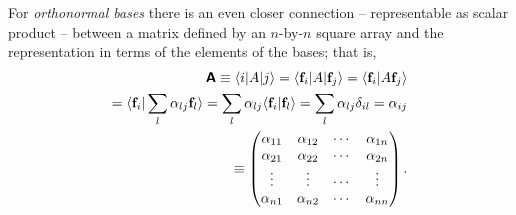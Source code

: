 For {\em orthonormal bases}
there is an even closer connection -- representable as scalar product -- between a matrix
defined by an $n$-by-$n$ square array and the representation in terms of the elements of the bases; that is,
\begin{equation}
\begin{split}
\textsf{\textbf{A}}
\equiv \langle i\vert A\vert j\rangle =
 \langle {\bf f}_i \vert A \vert {\bf f}_j\rangle
= \langle {\bf f}_i \vert A   {\bf f}_j\rangle \\
= \langle {\bf f}_i \vert \sum_l \alpha_{lj}{\bf f}_l \rangle
=  \sum_l \alpha_{lj} \langle {\bf f}_i \vert {\bf f}_l \rangle
=  \sum_l \alpha_{lj} \delta_{il}  = \alpha_{ij} \\
\equiv
\begin{pmatrix}
\alpha_{11}&
\alpha_{12}&
\cdots    &
\alpha_{1n}\\
\alpha_{21}&
\alpha_{22}&
\cdots    &
\alpha_{2n}\\
\vdots&
\vdots&
\cdots    &
\vdots\\
\alpha_{n1}&
\alpha_{n2}&
\cdots   &
\alpha_{nn}
\end{pmatrix}
.
\end{split}
\end{equation}





